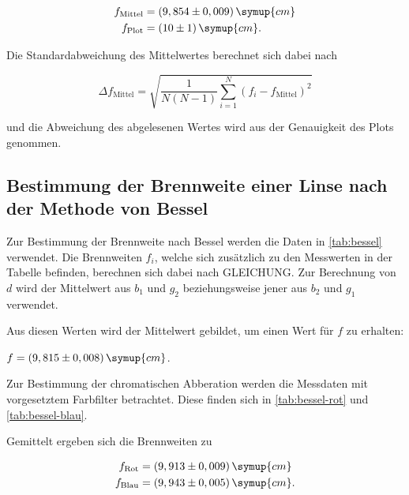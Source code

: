 \begin{align*}
    f_\text{Mittel} &= (9,854 \pm 0,009) \, \symup{cm}\\
    f_\text{Plot} &= (10 \pm 1) \, \symup{cm}.
\end{align*}

Die Standardabweichung des Mittelwertes berechnet sich dabei nach

\begin{equation}
  \label{eqn:mittel}
  \Delta f_\text{Mittel} = \sqrt{ \frac{1}{N(N-1)} \sum^N_{i=1} (f_i - f_\text{Mittel})^2 }
\end{equation}

und die Abweichung des abgelesenen Wertes wird aus der Genauigkeit des Plots genommen.



\subsection{Bestimmung der Brennweite einer Linse nach der Methode von Bessel}

Zur Bestimmung der Brennweite nach Bessel werden die Daten in \autoref{tab:bessel} verwendet.
Die Brennweiten $f_i$, welche sich zusätzlich zu den Messwerten in der Tabelle befinden, berechnen sich dabei nach GLEICHUNG.
Zur Berechnung von $d$ wird der Mittelwert aus $b_1$ und $g_2$ beziehungsweise jener aus $b_2$ und $g_1$ verwendet.



Aus diesen Werten wird der Mittelwert gebildet, um einen Wert für $f$ zu erhalten:

\begin{center}
  $f = (9,815 \pm 0,008) \, \symup{cm}$.
\end{center}

Zur Bestimmung der chromatischen Abberation werden die Messdaten mit vorgesetztem Farbfilter betrachtet.
Diese finden sich in \autoref{tab:bessel-rot} und \autoref{tab:bessel-blau}.





Gemittelt ergeben sich die Brennweiten zu

\begin{align*}
  f_\text{Rot} &=  (9,913 \pm 0,009) \, \symup{cm}\\
  f_\text{Blau} &= (9,943 \pm 0,005) \, \symup{cm}.
\end{align*}



